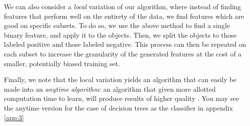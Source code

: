 \documentclass[12pt, a4paper]{article}
\theoremstyle{definition}
\begin{document}
We can also consider a \emph{local} variation of our algorithm, where instead of finding features that perform well on the entirety of the data, we find features which are good on specific subsets. To do so, we use the above method to find a single binary feature, and apply it to the objects. Then, we split the objects to those labeled positive and those labeled negative. This process can then be repeated on each subset to increase the granularity of the generated features at the cost of a smaller, potentially biased training set.

Finally, we note that the local variation yields an algorithm that can easily be made into an \emph{anytime algorithm}: an algorithm that given more allotted computation time to learn, will produce results of higher quality \citep{zilberstein1996using}. You may see the anytime version for the case of decision trees as the classifier in appendix \ref{app:3}

\end{document}
